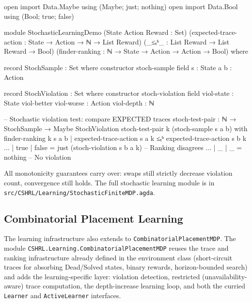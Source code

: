 \documentclass[9pt,a4paper]{article}
\newcommand{\fpath}[1]{\nolinkurl{#1}}
\theoremstyle{plain}
\theoremstyle{definition}
\theoremstyle{remark}
\begin{document}
\begin{code}[hide]
  open import Data.Maybe using (Maybe; just; nothing)
  open import Data.Bool using (Bool; true; false)
  
  module StochasticLearningDemo 
    (State Action Reward : Set)
    (expected-trace-action : State → Action → ℕ → List Reward)
    (_≤ₜᵇ_ : List Reward → List Reward → Bool)
    (finder-ranking : ℕ → State → Action → Action → Bool)
    where
    
    record StochSample : Set where
      constructor stoch-sample
      field
        s : State
        a b : Action
    
    record StochViolation : Set where
      constructor stoch-violation
      field
        viol-state : State
        viol-better viol-worse : Action
        viol-depth : ℕ
\end{code}

\begin{code}
    -- Stochastic violation test: compare EXPECTED traces
    stoch-test-pair : ℕ → StochSample → Maybe StochViolation
    stoch-test-pair k (stoch-sample s a b) with finder-ranking k s a b | 
                                    expected-trace-action s a k ≤ₜᵇ expected-trace-action s b k
    ... | true  | false = just (stoch-violation s b a k)  -- Ranking disagrees
    ... | _     | _     = nothing                          -- No violation
\end{code}

\noindent All monotonicity guarantees carry over: swaps still strictly decrease violation count, convergence still holds. The full stochastic learning module is in \fpath{src/CSHRL/Learning/StochasticFiniteMDP.agda}.

\subsection{Combinatorial Placement Learning}\label{sec:placement-learning}

The learning infrastructure also extends to \texttt{CombinatorialPlacementMDP}.  The module
\fpath{CSHRL.Learning.CombinatorialPlacementMDP} reuses the trace and ranking
infrastructure already defined in the environment class (short-circuit traces for
absorbing Dead/Solved states, binary rewards, horizon-bounded search) and adds
the learning-specific layer: violation detection, restricted
(unavailability-aware) trace computation, the depth-increase learning loop, and
both the curried \texttt{Learner} and \texttt{ActiveLearner} interfaces.
\end{document}
